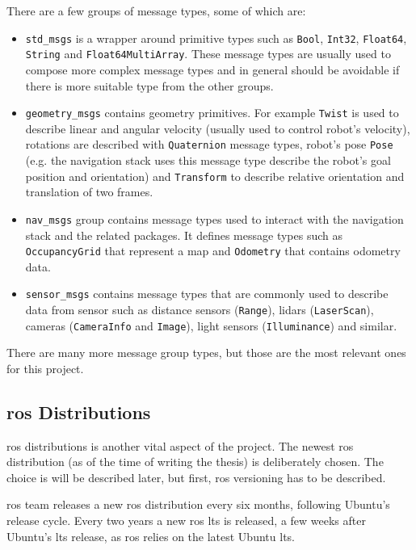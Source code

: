 There are a few groups of message types, some of which are:
\begin{itemize}
    \item \texttt{std\_msgs} is a wrapper around primitive types such as \texttt{Bool}, \texttt{Int32}, \texttt{Float64}, \texttt{String} and \texttt{Float64MultiArray}.
    These message types are usually used to compose more complex message types and in general should be avoidable if there is more suitable type from the other groups.
    \item \texttt{geometry\_msgs} contains geometry primitives.
    For example \texttt{Twist} is used to describe linear and angular velocity (usually used to control robot's velocity), rotations are described with \texttt{Quaternion} message types, robot's pose \texttt{Pose} (e.g. the navigation stack uses this message type describe the robot's goal position and orientation) and \texttt{Transform} to describe relative orientation and translation of two frames.
    \item \texttt{nav\_msgs} group contains message types used to interact with the navigation stack and the related packages.
    It defines message types such as \texttt{OccupancyGrid} that represent a map and \texttt{Odometry} that contains odometry data. 
    \item \texttt{sensor\_msgs} contains message types that are commonly used to describe data from sensor such as distance sensors (\texttt{Range}), \acsp{lidar} (\texttt{LaserScan}), cameras (\texttt{CameraInfo} and \texttt{Image}), light sensors (\texttt{Illuminance}) and similar. 
\end{itemize}

There are many more message group types, but those are the most relevant ones for this project.

\subsection{\ac{ros} Distributions}

\ac{ros} distributions is another vital aspect of the project.
The newest \ac{ros} distribution (as of the time of writing the thesis) is deliberately chosen.
The choice is will be described later, but first, \ac{ros} versioning has to be described.

\ac{ros} team releases a new \ac{ros} distribution every six months, following Ubuntu's release cycle.
Every two years a new \ac{ros} \ac{lts} is released,
a few weeks after Ubuntu's \ac{lts} release, as \ac{ros} relies on the latest Ubuntu \ac{lts}.

